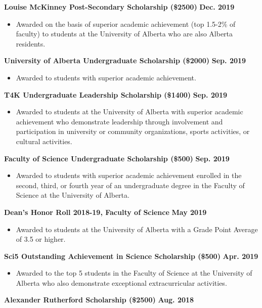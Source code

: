 \documentclass{article}
\begin{document}
    \textbf{Louise McKinney Post-Secondary Scholarship (\$2500)} \hfill \textbf{Dec. 2019}
        \begin{itemize}
            \item Awarded on the basis of superior academic achievement (top 1.5-2\% of faculty) to students at the University of Alberta who are also Alberta residents.
        \end{itemize}
    \textbf{University of Alberta Undergraduate Scholarship (\$2000)} \hfill \textbf{Sep. 2019}
        \begin{itemize}
            \item Awarded to students with superior academic achievement.
        \end{itemize}
    \textbf{T4K Undergraduate Leadership Scholarship (\$1400)} \hfill \textbf{Sep. 2019}
        \begin{itemize}
            \item Awarded to students at the University of Alberta with superior academic achievement who demonstrate leadership through involvement and participation in university or community organizations, sports activities, or cultural activities.
        \end{itemize}
    \textbf{Faculty of Science Undergraduate Scholarship (\$500)} \hfill \textbf{Sep. 2019}
        \begin{itemize}
            \item Awarded to students with superior academic achievement enrolled in the second, third, or fourth year of an undergraduate degree in the Faculty of Science at the University of Alberta.
        \end{itemize}
    \textbf{Dean's Honor Roll 2018-19, Faculty of Science} \hfill \textbf{May 2019}
        \begin{itemize}
            \item Awarded to students at the University of Alberta with a Grade Point Average of 3.5 or higher.
        \end{itemize}
    \textbf{Sci5 Outstanding Achievement in Science Scholarship (\$500)} \hfill \textbf{Apr. 2019}
        \begin{itemize}
            \item Awarded to the top 5 students in the Faculty of Science at the University of Alberta who also demonstrate exceptional extracurricular activities.
        \end{itemize}
    \textbf{Alexander Rutherford Scholarship (\$2500)} \hfill \textbf{Aug. 2018}
\end{document}
